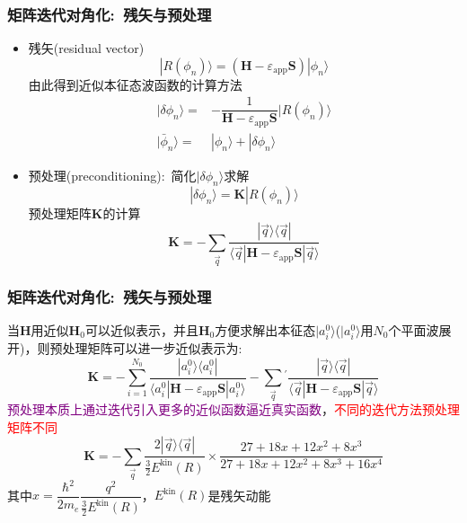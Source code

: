 \documentclass[cjk,slidestop,compress,mathserif,blue]{beamer}
\begin{document}
   \frame
   {
	   \frametitle{矩阵迭代对角化:~残矢与预处理}
	   \begin{itemize}
		   \item 残矢(\textrm{residual vector})
			   \begin{displaymath}
				   |R(\phi_n)\rangle=(\mathbf{H}-\varepsilon_{\mathrm{app}}\mathbf{S})|\phi_n\rangle
			   \end{displaymath}
			   由此得到近似本征态波函数的计算方法
			   \begin{displaymath}
				   \begin{aligned}
				   	|\delta\phi_n\rangle=&-\dfrac1{\mathbf{H}-\varepsilon_{\mathrm{app}}\mathbf{S}}|R(\phi_n)\rangle\\
					   |\bar\phi_n\rangle=&|\phi_n\rangle+|\delta\phi_n\rangle
				   \end{aligned}
			   \end{displaymath}
		   \item 预处理(\textrm{preconditioning}):~简化$|\delta\phi_n\rangle$求解
			   \begin{displaymath}
				   |\delta\phi_n\rangle=\mathbf{K}|R(\phi_n)\rangle
			   \end{displaymath}
			   预处理矩阵$\mathbf{K}$的计算
			   \begin{displaymath}
				   \mathbf{K}=-\sum_{\vec q}\dfrac{|\vec q\rangle\langle\vec q|}{\langle\vec q|\mathbf{H}-\varepsilon_{\mathrm{app}}\mathbf{S}|\vec q\rangle}
			   \end{displaymath}
	   \end{itemize}
   }

   \frame
   {
	   \frametitle{矩阵迭代对角化:~残矢与预处理}
	   当$\mathbf{H}$用近似$\mathbf{H}_0$可以近似表示，并且$\mathbf{H}_0$方便求解出本征态$|a_i^0\rangle$($|a_i^0\rangle$用$N_0$个平面波展开)，则预处理矩阵可以进一步近似表示为:~
			   \begin{displaymath}
				   \mathbf{K}=-\sum_{i=1}^{N_0}\dfrac{|a_i^0\rangle\langle a_i^0|}{\langle a_i^0|\mathbf{H}-\varepsilon_{\mathrm{app}}\mathbf{S}|a_i^0\rangle}-\sum_{\vec q}{}^{\prime}\dfrac{|\vec q\rangle\langle\vec q|}{\langle\vec q|\mathbf{H}-\varepsilon_{\mathrm{app}}\mathbf{S}|\vec q\rangle}
			   \end{displaymath}
			   \textcolor{purple}{预处理本质上通过迭代引入更多的近似函数逼近真实函数}，\textcolor{red}{不同的迭代方法预处理矩阵不同}
			   \begin{displaymath}
				   \mathbf{K}=-\sum_{\vec q}\dfrac{2|\vec q\rangle\langle\vec q|}{\frac32E^{\mathrm{kin}}(R)}\times\dfrac{27+18x+12x^2+8x^3}{27+18x+12x^2+8x^3+16x^4}
			   \end{displaymath}
			   其中$x=\dfrac{\hbar^2}{2m_e}\dfrac{q^2}{\frac32E^{\mathrm{kin}}(R)}$，$E^{\mathrm{kin}}(R)$是残矢动能
   }
\end{document}
